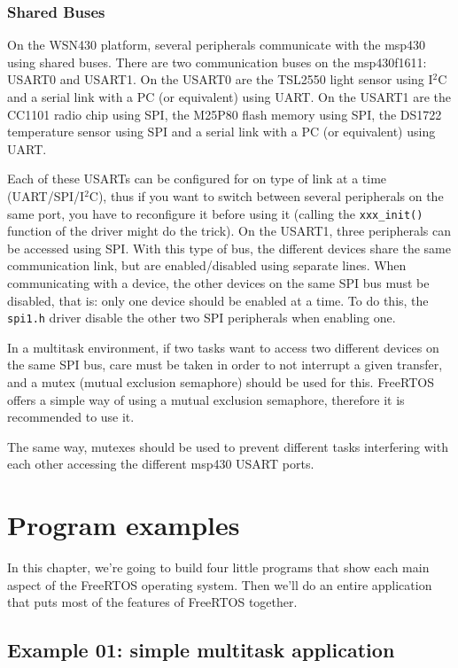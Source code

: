\documentclass[11pt]{report}
\begin{document}
\subsection{Shared Buses}
On the WSN430 platform, several peripherals communicate with the msp430 using shared buses. There are two communication buses on the msp430f1611: USART0 and USART1. On the USART0 are the TSL2550 light sensor using I$^2$C and a serial link with a PC (or equivalent) using UART. On the USART1 are the CC1101 radio chip using SPI, the M25P80 flash memory using SPI, the DS1722 temperature sensor using SPI and a serial link with a PC (or equivalent) using UART.

Each of these USARTs can be configured for on type of link at a time (UART/SPI/I$^2$C), thus if you want to switch between several peripherals on the same port, you have to reconfigure it before using it (calling the \verb$xxx_init()$ function of the driver might do the trick). On the USART1, three peripherals can be accessed using SPI. With this type of bus, the different devices share the same communication link, but are enabled/disabled using separate lines. When communicating with a device, the other devices on the same SPI bus must be disabled, that is: only one device should be enabled at a time. To do this, the \verb$spi1.h$ driver disable the other two SPI peripherals when enabling one.

In a multitask environment, if two tasks want to access two different devices on the same SPI bus, care must be taken in order to not interrupt a given transfer, and a mutex (mutual exclusion semaphore) should be used for this. FreeRTOS offers a simple way of using a mutual exclusion semaphore, therefore it is recommended to use it.

The same way, mutexes should be used to prevent different tasks interfering with each other accessing the different msp430 USART ports.


\chapter{Program examples}

In this chapter, we're going to build four little programs that show each main aspect of the FreeRTOS operating system. Then we'll do an entire application that puts most of the features of FreeRTOS together.

\section{Example 01: simple multitask application}
\end{document}
